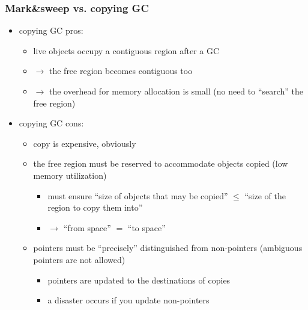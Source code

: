 \documentclass[11pt,dvipdfmx]{beamer}
\newif\ifja
\newif\ifeng
\newcommand{\mura}[1]{{\color{purple}#1}}
\newcommand{\ao}[1]{{\color{blue}#1}}
\begin{document}
\begin{frame}
\frametitle{Mark\&sweep vs. copying GC}
\begin{itemize}
\item copying GC pros:
  \begin{itemize}
  \item live objects occupy a contiguous region after a GC
  \item $\rightarrow$ the free region becomes contiguous too
  \item $\rightarrow$
    \ao{the overhead for memory allocation is small}
    (no need to ``search'' the free region)
  \end{itemize}
\item copying GC cons:
  \begin{itemize}
  \item copy is expensive, obviously
  \item the free region must be reserved to accommodate objects copied
    (low memory utilization)
    \begin{itemize}
    \item must ensure ``size of objects that may be copied''
      $\leq$ ``size of the region to copy them into''
    \item $\rightarrow$ ``from space'' $=$ ``to space''
    \end{itemize}
  \item pointers must be ``precisely'' distinguished from non-pointers
    (\mura{ambiguous pointers} are not allowed)
    \begin{itemize}
    \item pointers are updated to the destinations of copies
    \item a disaster occurs if you update non-pointers
    \end{itemize}
  \end{itemize}
\end{itemize}
\end{frame}
\fi


\ifja
\section{走査型GCのメモリ割り当てコスト(mark-cons比)}
\fi
\ifeng
\end{document}
